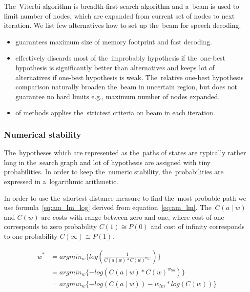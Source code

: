 The~Viterbi algorithm is breadth-first search algorithm and a~beam is used to limit number of nodes, which are expanded from current set of nodes to next iteration.
We list few alternatives how to set up the~beam for speech decoding.
\begin{itemize}
    \item {} guarantees maximum size of memory footprint and fast decoding.
    \item {} effectively discards most of the~improbably hypothesis if the~one-best hypothesis is significantly better than alternatives and keeps lot of alternatives if one-best hypothesis is weak.
        The~relative one-best hypothesis comparison naturally broaden the~beam in uncertain region, but does not guarantee no hard limits e.g., maximum number of nodes expanded.
    \item {} of methods applies the~strictest criteria on beam in each iteration.
\end{itemize}

\subsubsection*{Numerical stability}

The~hypotheses which are represented as the~paths of states are typically rather long in the~search graph and lot of hypothesis are assigned with tiny probabilities.
In order to keep the~numeric stability, the~probabilities are expressed in a~logarithmic arithmetic. 

In order to use the~shortest distance measure to find the~most probable path we use formula~\ref{eq:am_lm_log} derived from equation~\ref{eq:am_lm}.
The~$C(a \mid w)$ and $C(w)$ are costs with range between zero and one, where cost of one corresponds to zero probability $C(1) \cong P(0)$ and cost of infinity corresponds to one probability $C(\infty) \cong P(1)$.

\begin{equation}\label{eq:am_lm_log}
    \begin{split}
        w^* &= argmin_{w}\{log(\frac{1}{C(a \mid w) * C(w)^{w_{lm}}})\} \\
        &= argmin_{w}\{-log(C(a \mid w) * C(w)^{w_{lm}})\} \\
        &= argmin_{w}\{-log(C(a \mid w)) - w_{lm}*log( C(w))\} 
    \end{split}
\end{equation}

